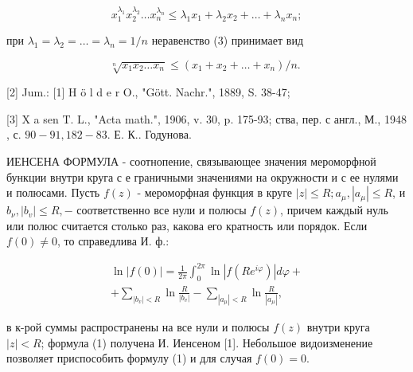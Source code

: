 \documentclass[10pt]{article}
\begin{document}
\[

x_{1}^{\lambda_{1}} x_{2}^{\lambda_{2}} \ldots x_{n}^{\lambda_{n}} \leqslant \lambda_{1} x_{1}+\lambda_{2} x_{2}+\ldots+\lambda_{n} x_{n} ;

\]



при $\lambda_{1}=\lambda_{2}=\ldots=\lambda_{n}=1 / n$ неравенство (3) принимает вид



\[

\sqrt[n]{x_{1} x_{2} \ldots x_{n}} \leqslant\left(x_{1}+x_{2}+\ldots+x_{n}\right) / n \text {. }

\]



[2] Jum.: [1] H ö l d e r O., "Gött. Nachr.", 1889, S. 38-47;



[3] X a sen $\mathrm{T}$. L., "Acta math.", 1906, v. 30, p. 175-93; ства, пер. с англ., М., 1948 , с. $90-91,182-83$. Е. К.. Годунова.



ИЕНСЕНА ФОРМУЛА - соотнопение, связывающее значения мероморфной бункции внутри круга с е граничными значениями на окружности и с ее нулями и полюсами. Пусть $f(z)$ - мероморфная функция в круге $|z| \leqslant R ; a_{\mu},\left|a_{\mu}\right| \leqslant R$, и $b_{\nu},\left|b_{v}\right| \leqslant R,-$ соответственно все нули и полюсы $f(z)$, причем каждый нуль или полюс считается столько раз, какова его кратность или порядок. Если $f(0) \neq 0$, то справедлива И. ф.:



\[

\begin{gathered}

\ln |f(0)|=\frac{1}{2 \pi} \int_{0}^{2 \pi} \ln \left|f\left(R e^{i \varphi}\right)\right| d \varphi+ \\

+\sum_{\left|b_{v}\right|<R} \ln \frac{R}{\left|b_{v}\right|}-\sum_{\left|a_{\mu}\right|<R} \ln \frac{R}{\left|a_{\mu}\right|},

\end{gathered}

\]



в к-рой суммы распространены на все нули и полюсы $f(z)$ внутри круга $|z|<R$; формула (1) получена И. Иенсеном [1]. Небольшое видоизменение позволяет приспособить формулу (1) и для случая $f(0)=0$.
\end{document}
